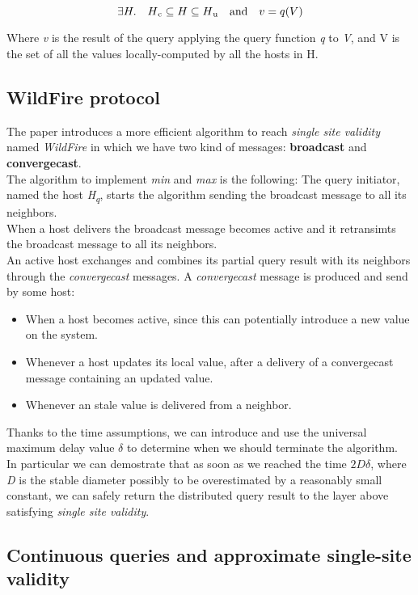 \documentclass{article}
\begin{document}
\begin{equation}
\exists H. \quad H\textsubscript{c} \subseteq H \subseteq H\textsubscript{u} \quad \textrm{and} \quad v = q(V)
\end{equation}

Where \emph{v} is the result of the query applying the query function \emph{q} to \emph{V}, and V is the set of all the values locally-computed by all the hosts in H.

\subsection{WildFire protocol}

The paper introduces a more efficient algorithm to reach \emph{single site validity} named \emph{WildFire} 
in which we have two kind of messages: \textbf{broadcast} and \textbf{convergecast}. \\
The algorithm to implement \emph{min} and \emph{max} is the following:
The query initiator, named the host \emph{H\textsubscript{q}}, starts the algorithm sending the broadcast message to all its neighbors. \\
When a host delivers the broadcast message becomes active and it retransimts the broadcast message to all its neighbors. \\
An active host exchanges and combines its partial query result with its neighbors through the \emph{convergecast} messages. 
A \emph{convergecast} message is produced and send by some host:
\begin{itemize}
  \item When a host becomes active, since this can potentially introduce a new value on the system.
  \item Whenever a host updates its local value, after a delivery of a convergecast message containing an updated value.
  \item Whenever an stale value is delivered from a neighbor.
\end{itemize}
Thanks to the time assumptions, we can introduce and use the universal maximum delay value $\delta$ to determine when we should terminate the algorithm. \\
In particular we can demostrate that as soon as we reached the time $2D\delta$, where \emph{D} is the stable diameter possibly to be overestimated by a reasonably small constant, we can safely return the distributed query result to the layer above satisfying \emph{single site validity}.

\subsection{Continuous queries and approximate single-site validity}
\end{document}
